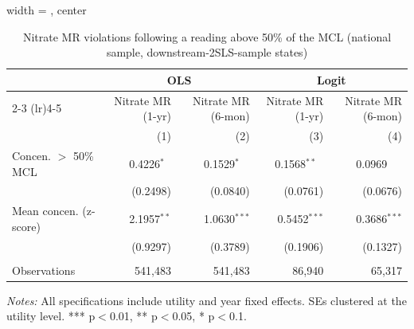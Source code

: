 
\begin{table}[htbp]
\caption{Nitrate MR violations following a reading above 50\% of the MCL (national sample, downstream-2SLS-sample states)}\label{tab:mr_concentration_lag_national_downstream_states}
\centering
\begin{adjustbox}{width = \textwidth, center}
   \begin{tabular}{lrrrr}
      \toprule    
       & \multicolumn{2}{c}{OLS} & \multicolumn{2}{c}{Logit} \\ \cmidrule(lr){2-3} \cmidrule(lr){4-5}
                      & Nitrate MR (1-yr) & Nitrate MR (6-mon)  & Nitrate MR (1-yr) & Nitrate MR (6-mon) \\   
                      & (1)               & (2)                 & (3)               & (4)\\  
      \midrule 
      Concen. $>$ 50\% MCL       & 0.4226$^{*\phantom{*}}$      & 0.1529$^{*\phantom{**}}$        & 0.1568$^{**\phantom{*}}$     & 0.0969$^{\phantom{***}}$\\   
                      & (0.2498)          & (0.0840)            & (0.0761)          & (0.0676)\\   
      Mean concen. (z-score)   & 2.1957$^{**}$     & 1.0630$^{***}$      & 0.5452$^{***}$    & 0.3686$^{***}$\\   
                      & (0.9297)          & (0.3789)            & (0.1906)          & (0.1327)\\   
       \\
      Observations    & 541,483           & 541,483             & 86,940            & 65,317\\  
      \bottomrule
   \end{tabular}
\end{adjustbox}
{\tiny\linespread{1}\selectfont \par \raggedright \textit{Notes:} All specifications include utility and year fixed effects. SEs clustered at the utility level. *** p$<$0.01, ** p$<$0.05, * p$<$0.1.}
\end{table}
